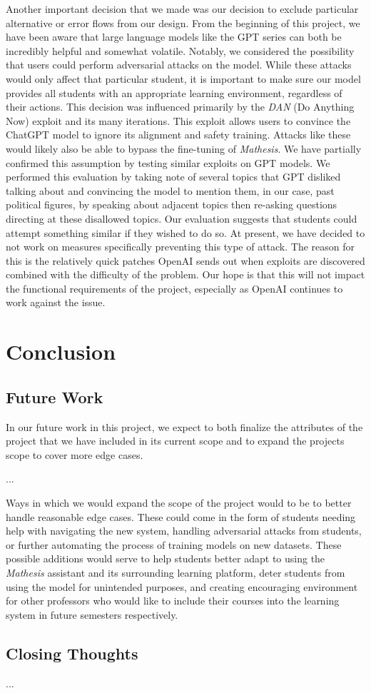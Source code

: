 \documentclass[12pt,a4paper]{article}
\begin{document}
    Another important decision that we made was our decision to exclude particular alternative or
    error flows from our design.  From the beginning of this project, we have been aware that
    large language models like the GPT series can both be incredibly helpful and somewhat volatile.
    Notably, we considered the possibility that users could perform adversarial attacks on the model.
    While these attacks would only affect that particular student, it is important to make sure
    our model provides all students with an appropriate learning environment, regardless of their actions.
    This decision was influenced primarily by the \textit{DAN}\cite{danThread} (Do Anything Now)
    exploit and its many iterations.  This exploit allows users to convince the ChatGPT model to
    ignore its alignment and safety training.  Attacks like these would likely also be able to
    bypass the fine-tuning of \textit{Mathesis}.  We have partially confirmed this assumption by
    testing similar exploits on GPT models.  We performed this evaluation by taking note of several
    topics that GPT disliked talking about and convincing the model to mention them, in our case,
    past political figures, by speaking about adjacent topics then re-asking questions directing
    at these disallowed topics.  Our evaluation suggests that students could attempt something
    similar if they wished to do so.  At present, we have decided to not work on measures
    specifically preventing this type of attack.  The reason for this is the relatively quick
    patches OpenAI sends out when exploits are discovered combined with the difficulty of the
    problem.  Our hope is that this will not impact the functional requirements of the project,
    especially as OpenAI continues to work against the issue.

    \section{Conclusion}

    \subsection{Future Work}
    In our future work in this project, we expect to both finalize the attributes of the project that
    we have included in its current scope and to expand the projects scope to cover more edge cases.

    ...

    Ways in which we would expand the scope of the project would to be to better handle reasonable
    edge cases.  These could come in the form of students needing help with navigating the new system,
    handling adversarial attacks from students, or further automating the process of training models
    on new datasets.  These possible additions would serve to help students better adapt to using the
    \textit{Mathesis} assistant and its surrounding learning platform, deter students from using
    the model for unintended purposes, and creating encouraging environment for other professors who
    would like to include their courses into the learning system in future semesters respectively.

    \subsection{Closing Thoughts}
    ...

    \pagebreak
    
    
    
\end{document}
